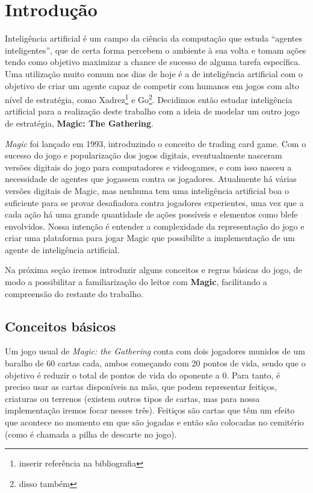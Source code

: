 \chapter{Introdução}

Inteligência artificial é um campo da ciência da computação que estuda
``agentes inteligentes'', que de certa forma percebem o ambiente à sua volta
e tomam ações tendo como objetivo maximizar a chance de sucesso de alguma
tarefa específica. Uma utilização muito comum nos dias de hoje é a de
inteligência artificial com o objetivo de criar um agente capaz de competir
com humanos em jogos com alto nível de estratégia, como Xadrez\footnote{inserir referência
na bibliografia} e Go\footnote{disso também}.
Decidimos então estudar inteligência artificial para a realização deste
trabalho com a ideia de modelar um outro jogo de estratégia,
\textbf{Magic: The Gathering}.

\textit{Magic} foi lançado em 1993, introduzindo o conceito de trading card
game. Com o sucesso do jogo e popularização dos jogos digitais, eventualmente
nasceram versões digitais do jogo para computadores e videogames, e com isso
nasceu a necessidade de agentes que jogassem contra os jogadores. Atualmente
há várias versões digitais de Magic, mas nenhuma tem uma inteligência artificial
boa o suficiente para se provar desafiadora contra jogadores experientes, uma vez
que a cada ação há uma grande quantidade de ações possíveis e elementos como
blefe envolvidos. Nossa intenção é entender a complexidade da representação do
jogo e criar uma plataforma para jogar Magic que possibilite a implementação de
um agente de inteligência artificial.

Na próxima seção iremos introduzir alguns conceitos e regras básicas do jogo,
de modo a possibilitar a familiarização do leitor com \textbf{Magic}, facilitando
a compreensão do restante do trabalho.

\section{Conceitos básicos}

Um jogo usual de \textit{Magic: the Gathering} conta com dois jogadores munidos
de um baralho de 60 cartas cada, ambos começando com 20 pontos de vida, sendo
que o objetivo é reduzir o total de pontos de vida do oponente a 0. Para tanto,
é preciso usar as cartas disponíveis na mão, que podem representar feitiços,
criaturas ou terrenos (existem outros tipos de cartas, mas para nossa implementação
iremos focar nesses três). Feitiços são cartas que têm um efeito que acontece
no momento em que são jogadas e então são colocadas no cemitério (como é chamada
a pilha de descarte no jogo).

